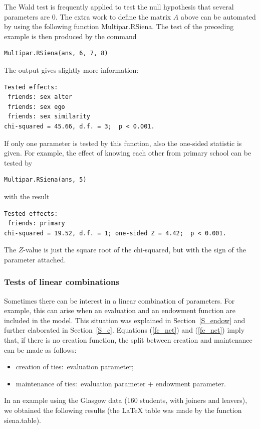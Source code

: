 \documentclass[a4paper,fleqn,11pt]{article}
\newcommand{\+}{\, + \,}
\newcommand{\sfn}[1]{\textsf{#1}}
\begin{document}
The Wald test is frequently applied to test the null
hypothesis that several parameters are 0.
The extra work to define the matrix $A$ above can be automated
by using the following function \sfn{Multipar.RSiena}.
The test of the preceding example is then produced by the command
\begin{verbatim}
Multipar.RSiena(ans, 6, 7, 8)
\end{verbatim}
The output gives slightly more information:
\begin{verbatim}
Tested effects:
 friends: sex alter
 friends: sex ego
 friends: sex similarity
chi-squared = 45.66, d.f. = 3;  p < 0.001.
\end{verbatim}
If only one parameter is tested by this function, also the
one-sided statistic is given. For example, the effect
of knowing each other from primary school can be tested by
\begin{verbatim}
Multipar.RSiena(ans, 5)
\end{verbatim}
with the result
\begin{verbatim}
Tested effects:
 friends: primary
chi-squared = 19.52, d.f. = 1; one-sided Z = 4.42;  p < 0.001.
\end{verbatim}
The $Z$-value is just the square root of the chi-squared,
but with the sign of the parameter attached.


\subsubsection{Tests of linear combinations}

Sometimes there can be interest in a linear combination of parameters.
For example, this can arise when an evaluation and an endowment function
are included in the model.
This situation was explained in Section~\ref{S_endow} and
further elaborated in Section~\ref{S_c}.
Equations (\ref{fc_net}) and (\ref{fe_net}) imply that,
if there is no creation function,
the split between creation and maintenance can be made as follows:
\begin{itemize}
\item creation of ties:\  evaluation parameter;
\item maintenance of ties:\ evaluation parameter + endowment parameter.
\end{itemize}

In an example using the Glasgow data (160 students, with joiners and leavers),
we obtained the following results (the LaTeX table was made by the function
\textsf{siena.table}).
\end{document}
